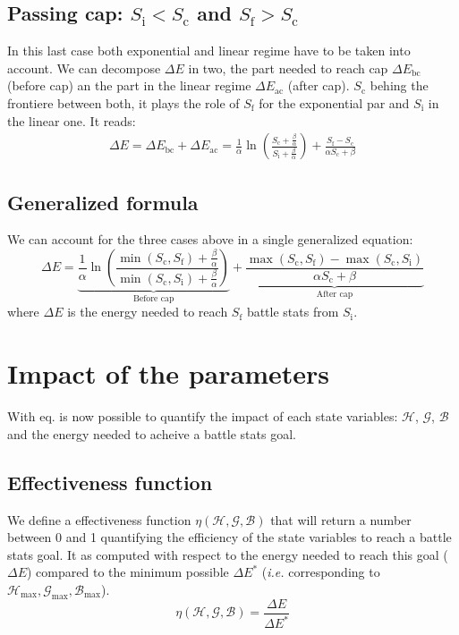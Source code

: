\documentclass[12pt]{article}
\def\Ef{\eta}
\def\happy{\mathcal{H}}
\def\gym{\mathcal{G}}
\def\bonus{\mathcal{B}}
\def\Sc{S_\text{c}}
\def\Si{S_\text{i}}
\def\Sf{S_\text{f}}
\begin{document}
\subsection{Passing cap: $\Si < \Sc$ and $\Sf > \Sc$}
In this last case both exponential and linear regime have to be taken into account.
We can decompose $\Delta E$ in two, the part needed to reach cap $\Delta E_\text{bc}$ (before cap) an the part in the linear regime $\Delta E_\text{ac}$ (after cap). $\Sc$ behing the frontiere between both, it plays the role of $\Sf$ for the exponential par and $\Si$ in the linear one. It reads:
\begin{equation}
    \begin{aligned}
        \Delta E = \Delta E_\text{bc} + \Delta E_\text{ac} = \frac{1}{\alpha} \ln\left( \frac{\Sc + \frac{\beta}{\alpha}}{\Si + \frac{\beta}{\alpha}} \right) + \frac{\Sf - \Sc}{\alpha \Sc + \beta}
    \end{aligned}
\end{equation}
\subsection{Generalized formula}
We can account for the three cases above in a single generalized equation:
\begin{equation}
    \boxed{\Delta E = \underbrace{\frac{1}{\alpha} \ln\left( \frac{\min(\Sc, \Sf) + \frac{\beta}{\alpha}}{\min(\Sc, \Si) + \frac{\beta}{\alpha}} \right)}_\text{Before cap} + \underbrace{\frac{\max(\Sc, \Sf) - \max(\Sc, \Si)}{\alpha \Sc + \beta}}_\text{After cap}}
    \label{eq:de-s-general}
\end{equation}
where $\Delta E$ is the energy needed to reach $\Sf$ battle stats from $\Si$.

\section{Impact of the parameters}
With eq.\label{eq:de-s-general} is now possible to quantify the impact of each state variables: $\happy$, $\gym$, $\bonus$ and the energy needed to acheive a battle stats goal.

\subsection{Effectiveness function}
We define a effectiveness function $\Ef(\happy, \gym, \bonus)$ that will return a number between 0 and 1 quantifying the efficiency of the state variables to reach a battle stats goal. It as computed with respect to the energy needed to reach this goal ($\Delta E$) compared to the minimum possible $\Delta E^*$ ({\it i.e.} corresponding to $\happy_\text{max}, \gym_\text{max}, \bonus_\text{max}$).
\begin{equation}
    \Ef(\happy, \gym, \bonus) = \frac{\Delta E}{\Delta E^*}
\end{equation}
\end{document}
